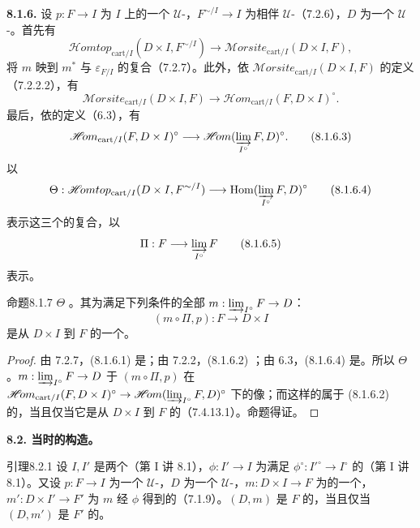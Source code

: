 \textbf{8.1.6.} 设 $p:F\to I$ 为 $I$ 上的一个 $\mathcal U$-，$F^{\sim/I}\to I$ 为相伴 $\mathcal U$-（7.2.6），$D$ 为一个 $\mathcal U$-。首先有
\[\mathscr{H}\!omtop_{\mathrm{cart}/I}(D\times I,F^{\sim/I})\longrightarrow\mathscr{M}orsite_{\mathrm{cart}/I}(D\times I,F),\tag{8.1.6.1}\]
将 $m$ 映到 $m^*$ 与 $\varepsilon_{F/I}$ 的复合（7.2.7）。此外，依 $\mathscr{M}orsite_{\mathrm{cart}/I}(D\times I,F)$ 的定义（7.2.2.2），有
\[\mathscr{M}orsite_{\mathrm{cart}/I}(D\times I,F)\longrightarrow\mathscr{H}\!om_{\mathrm{cart}/I}(F,D\times I)^\circ.\tag{8.1.6.2}\]
最后，依的定义（6.3），有
\[\mathscr{H}\!om_{\mathrm{cart}/I}(F,D\times I)^\circ\longrightarrow\mathscr{H}\!om(\varinjlim_{I^\circ}F,D)^\circ.\tag{8.1.6.3}\]
以
\[\Theta:\mathscr{H}\!omtop_{\mathrm{cart}/I}(D\times I,F^{\sim/I})\longrightarrow\operatorname{Hom}(\varinjlim_{I^\circ}F,D)^\circ\tag{8.1.6.4}\]
表示这三个的复合，以
\[\Pi:F\longrightarrow\varinjlim_{I^\circ}F\tag{8.1.6.5}\]
表示。
\begin{SGAresult}{命题}{8.1.7}
 $\Theta$ 。其为满足下列条件的全部 $m:\varinjlim_{I^\circ}F\to D$：
\[(m\circ\Pi,p):F\longrightarrow D\times I\]
是从 $D\times I$ 到 $F$ 的一个。
\end{SGAresult}
\begin{proof}
由 7.2.7，(8.1.6.1) 是；由 7.2.2，(8.1.6.2) ；由 6.3，(8.1.6.4) 是。所以 $\Theta$ 。$m:\varinjlim_{I^\circ}F\to D$ 于 $(m\circ\Pi,p)$ 在 $\mathscr{H}\!om_{\mathrm{cart}/I}(F,D\times I)^\circ\to\mathscr{H}\!om(\varinjlim_{I^\circ}F,D)^\circ$ 下的像；而这样的属于 (8.1.6.2) 的，当且仅当它是从 $D\times I$ 到 $F$ 的（7.4.13.1）。命题得证。
\end{proof}
\textbf{8.2. 当时的构造。}
\begin{SGAresult}{引理}{8.2.1}
设 $I,I'$ 是两个（第 I 讲 8.1），$\phi:I'\to I$ 为满足 $\phi^\circ:I'^\circ\to I^\circ$ 的（第 I 讲 8.1）。又设 $p:F\to I$ 为一个 $\mathcal U$-，$D$ 为一个 $\mathcal U$-，$m:D\times I\to F$ 为的一个，$m':D\times I'\to F'$ 为 $m$ 经 $\phi$ 得到的（7.1.9）。$(D,m)$ 是 $F$ 的，当且仅当 $(D,m')$ 是 $F'$ 的。
\end{SGAresult}
